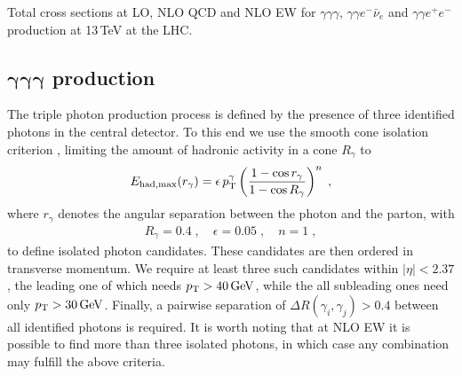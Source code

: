 \begin{table}[t!]
  
  \caption{
    Total cross sections at LO, NLO QCD and NLO EW for $\gamma\gamma\gamma$, 
    $\gamma\gamma e^-\bar\nu_e$ and $\gamma\gamma e^+e^-$
    production at 13\,TeV at the LHC.
    \label{tab:xsec}
  } 
\end{table}


\subsection[\texorpdfstring{$\gamma\gamma\gamma$}{aaa} production]
           {$\boldsymbol{\gamma\gamma\gamma}$ production}
\label{sec:results:aaa}

The triple photon production process is defined 
by the presence of three identified photons in the 
central detector. 
To this end we use the smooth cone isolation 
criterion \cite{Frixione:1998jh}, limiting the amount of 
hadronic activity in a cone $R_\gamma$ to
\begin{equation}
  \begin{split}
    E_{{\rm had, max}} (r_{\gamma})
    = \epsilon\, p_\text{T}^{\gamma} \left( \frac{1-\cos r_\gamma}
				       {1-\cos R_\gamma}\right)^{n}\;,
  \end{split}
  \label{eq:frix}
\end{equation}
where $r_{\gamma}$ denotes the angular separation between the photon and 
the parton, with 
\begin{equation}
  \label{eq:coneparams}
  \begin{split}
    R_{\gamma}=0.4\;, \quad \epsilon = 0.05\;, \quad n = 1\;, 
  \end{split}
\end{equation}
to define isolated photon candidates.
These candidates are then ordered in transverse momentum. 
We require at least three such candidates within $|\eta|<2.37$, 
the leading one of which needs $p_\text{T}>40\,\text{GeV}$, 
while the all subleading ones need only 
$p_\text{T}>30\,\text{GeV}$. 
Finally, a pairwise separation of $\Delta R(\gamma_i,\gamma_j)>0.4$ 
between all identified photons is required.
It is worth noting that at NLO EW it is possible to find more 
than three isolated photons, in which case any combination may 
fulfill the above criteria. 

